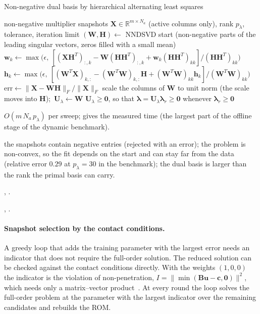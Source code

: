\begin{algbox}{Non-negative dual basis by hierarchical alternating least squares}
\begin{pseudo}
\Require non-negative multiplier snapshots $\bm X\in\mathbb R^{m\times N_a}$ (active columns only), rank $p_\lambda$, tolerance, iteration limit
\State $(\bm W,\bm H)\gets$ NNDSVD start (non-negative parts of the leading singular vectors, zeros filled with a small mean)
\Repeat
    \State $\bm w_k\gets\max\!\big(\epsilon,\ [(\bm X\bm H^T)_{:,k}-\bm W(\bm H\bm H^T)_{:,k}+\bm w_k(\bm H\bm H^T)_{kk}]/(\bm H\bm H^T)_{kk}\big)$
  \EndFor
    \State $\bm h_k\gets\max\!\big(\epsilon,\ [(\bm W^T\bm X)_{k,:}-(\bm W^T\bm W)_{k,:}\bm H+(\bm W^T\bm W)_{kk}\bm h_k]/(\bm W^T\bm W)_{kk}\big)$
  \EndFor
  \State $\mathrm{err}\gets\|\bm X-\bm W\bm H\|_F/\|\bm X\|_F$
\State scale the columns of $\bm W$ to unit norm (the scale moves into $\bm H$);\ $\bm U_\lambda\gets\bm W$
\Ensure $\bm U_\lambda\ge\bm 0$, so that $\bm\lambda=\bm U_\lambda\bm\lambda_r\ge\bm0$ whenever $\bm\lambda_r\ge\bm0$
\end{pseudo}
\begin{algdet}
\item[Cost] $O(m\,N_a\,p_\lambda)$ per sweep;  gives the measured time (the largest part of the offline stage of the dynamic benchmark).
\item[Fails when] the snapshots contain negative entries (rejected with an error); the problem is non-convex, so the fit depends on the start and can stay far from the data (relative error $0.29$ at $p_\lambda=30$ in the benchmark); the dual basis is larger than the rank the primal basis can carry.
\item[Code] , .
\item[Verified in] , .
\end{algdet}
\end{algbox}

\paragraph{Snapshot selection by the contact conditions.}
A greedy loop that adds the training parameter with the largest error needs an indicator that does not require the full-order solution. The reduced solution can be checked against the contact conditions directly. With the weights $(1,0,0)$ the indicator is the violation of non-penetration, $I=\|\min(\bm B\bm u-\bm c,\bm0)\|^2$, which needs only a matrix--vector product~\cite{balajewicz2016contact}. At every round the loop solves the full-order problem at the parameter with the largest indicator over the remaining candidates and rebuilds the ROM.

